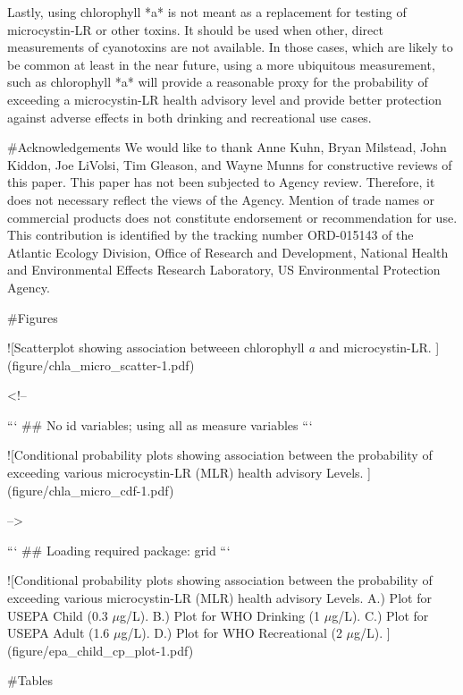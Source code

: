 Lastly, using chlorophyll *a* is not meant as a replacement for testing of microcystin-LR or other toxins.  It should be used when other, direct measurements of cyanotoxins are not available.  In those cases, which are likely to be common at least in the near future, using a more ubiquitous measurement, such as chlorophyll *a* will provide a reasonable proxy for the probability of exceeding a microcystin-LR health advisory level and provide better protection against adverse effects in both drinking and recreational use cases. 

#Acknowledgements
We would like to thank Anne Kuhn, Bryan Milstead, John Kiddon, Joe LiVolsi, Tim Gleason, and Wayne Munns for constructive reviews of this paper. This paper has not been subjected to Agency review. Therefore, it does not necessary reflect the views of the Agency. Mention of trade names or commercial products does not constitute endorsement or recommendation for use. This contribution is identified by the tracking number ORD-015143 of the Atlantic Ecology Division, Office of Research and Development, National Health and Environmental Effects Research Laboratory, US Environmental Protection Agency.


\newpage

#Figures

![Scatterplot showing association betweeen chlorophyll \textit{a} and microcystin-LR. \label{fig:chla_micro_scatter}](figure/chla_micro_scatter-1.pdf) 

\newpage

<!--

```
## No id variables; using all as measure variables
```

![Conditional probability plots showing association between the probability of exceeding various microcystin-LR (MLR) health advisory Levels. \label{fig:chla_micro_cdf}](figure/chla_micro_cdf-1.pdf) 

\newpage-->


```
## Loading required package: grid
```

![Conditional probability plots showing association between the probability of exceeding various microcystin-LR (MLR) health advisory Levels. A.) Plot for USEPA Child (0.3 $\mu$g/L). B.) Plot for WHO Drinking (1 $\mu$g/L). C.) Plot for USEPA Adult (1.6 $\mu$g/L). D.) Plot for WHO Recreational (2 $\mu$g/L). \label{fig:multi_cp_plot}](figure/epa_child_cp_plot-1.pdf) 

\newpage

#Tables


